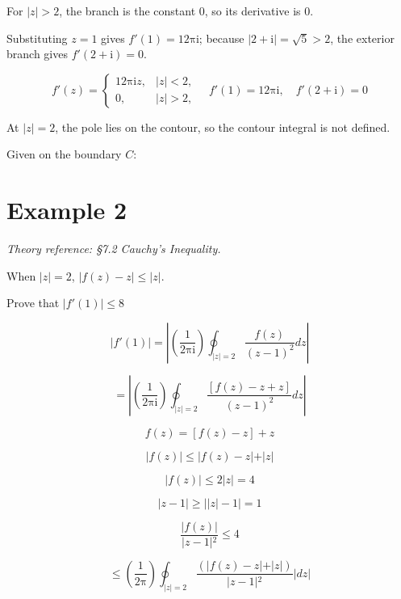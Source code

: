 \documentclass[11pt,a4paper]{article}
\theoremstyle{definition}
\theoremstyle{plain}
\begin{document}
For $\vert{}z\vert{} > 2$, the branch is the constant 0, so its derivative is 0.

Substituting $z = 1$ gives $f'(1) = 12\mathrm{\pi}\mathrm{i}$; because $\vert{}2 + \mathrm{i}\vert{} = \sqrt{5} > 2$, the exterior branch gives $f'(2 + \mathrm{i}) = 0$.

\begin{equation}
f'(z) = \begin{cases} 12\mathrm{\pi}\mathrm{i}z, & \vert{}z\vert{} < 2, \\ 0, & \vert{}z\vert{} > 2, \end{cases}\quad f'(1) = 12\mathrm{\pi}\mathrm{i}, \quad f'(2 + \mathrm{i}) = 0
\end{equation}

At $\vert{}z\vert{} = 2$, the pole lies on the contour, so the contour integral is not defined.

Given on the boundary $C$:

\section*{Example 2}

\textit{Theory reference: §7.2 Cauchy's Inequality.}

When $\vert{}z\vert{} = 2$, $\vert{}f(z) - z\vert{} \le \vert{}z\vert{}$.

Prove that $\vert{}f'(1)\vert{} \le 8$

\begin{equation}
\vert{}f'(1)\vert{} = \left\vert{}\left(\frac{1}{2\mathrm{\pi}\mathrm{i}}\right)\oint_{\vert{}z\vert{} = 2}\frac{f(z)}{(z - 1)^{2}}dz\right\vert{}
\end{equation}

\[
= \left\vert{}\left(\frac{1}{2\mathrm{\pi}\mathrm{i}}\right)\oint_{\vert{}z\vert{} = 2}\frac{[f(z) - z + z]}{(z - 1)^{2}}dz\right\vert{}
\]

\[
f(z) = [f(z) - z] + z
\]

\[
\vert{}f(z)\vert{} \le \vert{}f(z) - z\vert{} + \vert{}z\vert{}
\]

\[
\vert{}f(z)\vert{} \le 2\vert{}z\vert{} = 4
\]

\[
\vert{}z - 1\vert{} \ge \vert{}\vert{}z\vert{} - 1\vert{} = 1
\]

\[
\frac{\vert{}f(z)\vert{}}{\vert{}z - 1\vert{}^{2}} \le 4
\]

\[
\le \left(\frac{1}{2\mathrm{\pi}}\right)\oint_{\vert{}z\vert{} = 2}\frac{(\vert{}f(z) - z\vert{} + \vert{}z\vert{})}{\vert{}z - 1\vert{}^{2}}\vert{}dz\vert{}
\]
\end{document}
